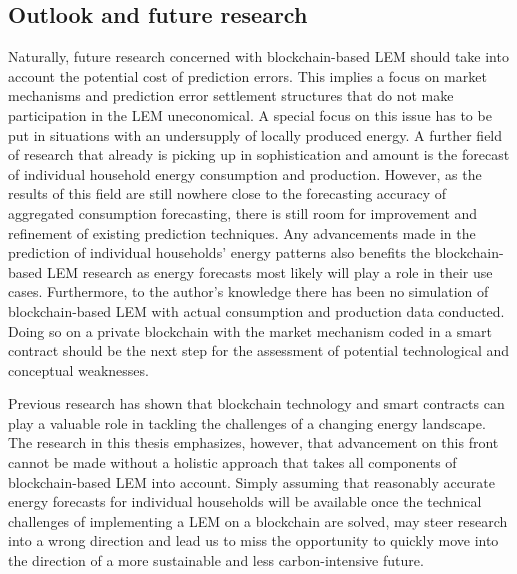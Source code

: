 
\subsection{Outlook and future research}\label{Sec:Conclusion;Subsec:Outlook}

Naturally, future research concerned with blockchain-based LEM should take into account the potential cost of prediction errors. This implies a focus on market mechanisms and prediction error settlement structures that do not make participation in the LEM uneconomical. A special focus on this issue has to be put in situations with an undersupply of locally produced energy. A further field of research that already is picking up in sophistication and amount is the forecast of individual household energy consumption and production. However, as the results of this field are still nowhere close to the forecasting accuracy of aggregated consumption forecasting, there is still room for improvement and refinement of existing prediction techniques. Any advancements made in the prediction of individual households' energy patterns also benefits the blockchain-based LEM research as energy forecasts most likely will play a role in their use cases. Furthermore, to the author's knowledge there has been no simulation of blockchain-based LEM with actual consumption and production data conducted. Doing so on a private blockchain with the market mechanism coded in a smart contract should be the next step for the assessment of potential technological and conceptual weaknesses.

Previous research has shown that blockchain technology and smart contracts can play a valuable role in tackling the challenges of a changing energy landscape. The research in this thesis emphasizes, however, that advancement on this front cannot be made without a holistic approach that takes all components of blockchain-based LEM into account. Simply assuming that reasonably accurate energy forecasts for individual households will be available once the technical challenges of implementing a LEM on a blockchain are solved, may steer research into a wrong direction and lead us to miss the opportunity to quickly move into the direction of a more sustainable and less carbon-intensive future.


